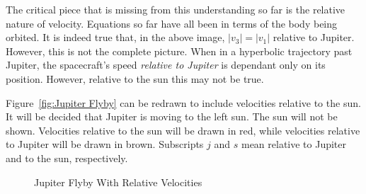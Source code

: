 \documentclass[../basicOrbitalDynamics.tex]{subfiles}
\begin{document}
The critical piece that is missing from this understanding so far is the relative nature of velocity. Equations so far have all been in terms of the body being orbited. It is indeed true that, in the above image, $|v_3|=|v_1|$ relative to Jupiter. However, this is not the complete picture. When in a hyperbolic trajectory past Jupiter, the spacecraft's speed \textit{relative to Jupiter} is dependant only on its position. However, relative to the sun this may not be true.

Figure~\ref{fig:Jupiter Flyby} can be redrawn to include velocities relative to the sun. It will be decided that Jupiter is moving to the left sun. The sun will not be shown. Velocities relative to the sun will be drawn in red, while velocities relative to Jupiter will be drawn in brown. Subscripts $j$ and $s$ mean relative to Jupiter and to the sun, respectively.

\begin{figure}[H]
    \centering
    \caption{Jupiter Flyby With Relative Velocities}\label{fig:Jupiter Flyby Rel Velocities}
\end{figure}
\end{document}
